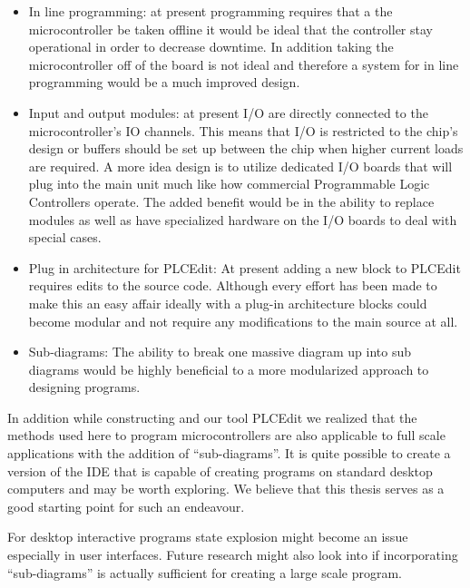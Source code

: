 \begin{itemize}
	\item In line programming: at present programming requires that a the microcontroller be taken offline it would be ideal that the controller stay operational in order to decrease downtime. In addition taking the microcontroller off of the board is not ideal and therefore a system for in line programming would be a much improved design.
	\item Input and output modules: at present I/O are directly connected to the microcontroller's IO channels. This means that I/O is restricted to the chip's design or buffers should be set up between the chip when higher current loads are required. A more idea design is to utilize dedicated I/O boards that will plug into the main unit much like how commercial Programmable Logic Controllers operate. The added benefit would be in the ability to replace modules as well as have specialized hardware on the I/O boards to deal with special cases.
	\item Plug in architecture for PLCEdit: At present adding a new block to PLCEdit requires edits to the source code. Although every effort has been made to make this an easy affair ideally with a plug-in architecture blocks could become modular and not require any modifications to the main source at all.
	\item Sub-diagrams: The ability to break one massive diagram up into sub diagrams would be highly beneficial to a more modularized approach to designing programs.
\end{itemize}

In addition while constructing \plccharts and our tool PLCEdit we realized that the methods used here to program microcontrollers are also applicable to full scale applications with the addition of ``sub-diagrams''. It is quite possible to create a version of the IDE that is capable of creating programs on standard desktop computers and may be worth exploring. We believe that this thesis serves as a good starting point for such an endeavour.

For desktop interactive programs state explosion might become an issue especially in user interfaces. Future research might also look into if incorporating ``sub-diagrams'' is actually sufficient for creating a large scale program.